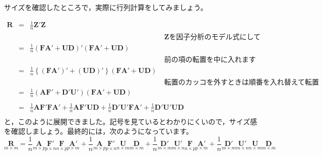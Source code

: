 \documentclass{ltjsbook}
\begin{document}
サイズを確認したところで，実際に行列計算をしてみましょう。

\begin{equation}
	\begin{array}{lll}
		\bm{R} & = & \frac{1}{n} \bm{Z}'\bm{Z}                                                                                                                                                      \\
		       &   & \hspace{8cm}\text{$\bm{Z}$を因子分析のモデル式にして}                                                                                                                                       \\
		       & = & \frac{1}{n}(\bm{F} \bm{A} ' + \bm{U} \bm{D})'(\bm{F} \bm{A} ' + \bm{U} \bm{D})                                                                                                 \\
		       &   & \hspace{8cm}\text{前の項の転置を中に入れます}                                                                                                                                               \\
		       & = & \frac{1}{n}\left \{ (\bm{F} \bm{A} ')'+(\bm{U} \bm{D})' \right \}(\bm{F} \bm{A} ' + \bm{U} \bm{D})                                                                             \\
		       &   & \hspace{8cm}\text{転置のカッコを外すときは順番を入れ替えて転置}                                                                                                                                      \\
		       & = & \frac{1}{n}(\bm{A} \bm{F} ' + \bm{D}' \bm{U} ')(\bm{F} \bm{A} ' + \bm{U} \bm{D})                                                                                               \\
		       &   & \hspace{8cm}                                                                                                                                                                   \\
		       & = & \frac{1}{n}\bm{A} \bm{F}' \bm{F} \bm{A}' + \frac{1}{n} \bm{A} \bm{F}' \bm{U} \bm{D} + \frac{1}{n} \bm{D}' \bm{U} ' \bm{F} \bm{A} ' + \frac{1}{n} \bm{D}' \bm{U}' \bm{U} \bm{D} \\
	\end{array}
\end{equation}
と，このように展開できました。記号を見ているとわかりにくいので，サイズ感を確認しましょう。最終的には，次のようになっています。
\[
	\underset{m \times m}{\bm{R}} =
	\frac{1}{n} \underset{m \times p}{\bm{A}} \underset{p \times n}{\bm{F}'} \underset{n \times p}{\bm{F}} \underset{p \times m}{\bm{A}'} +
	\frac{1}{n} \underset{m \times p}{\bm{A}} \underset{p \times n}{\bm{F}'} \underset{n \times m}{\bm{U}} \underset{m \times m}{\bm{D}} +
	\frac{1}{n} \underset{m \times m}{\bm{D}'} \underset{m \times n}{\bm{U}'} \underset{n \times p}{\bm{F}} \underset{p \times m}{\bm{A}'} +
	\frac{1}{n} \underset{m \times m}{\bm{D}'} \underset{m \times n}{\bm{U}'} \underset{n \times m}{\bm{U}} \underset{m \times m}{\bm{D}}
\]
\end{document}
